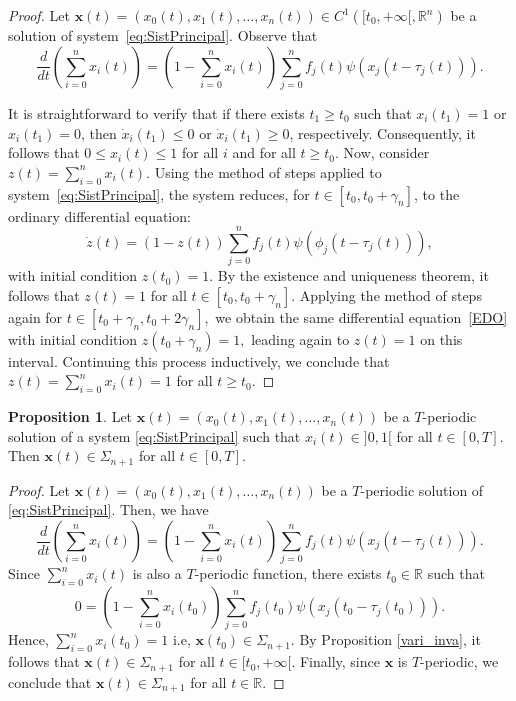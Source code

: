 \documentclass[11pt,reqno]{amsart}
\theoremstyle{definition}
\newtheorem{Proposition}{Proposition}
\begin{document}
\begin{proof}
Let $ \mathbf x(t) = (x_0(t), x_1(t), \dotsc, x_n(t)) \in C^1([t_0, +\infty[, \mathbb{R}^n) $ be a solution of system~\eqref{eq:SistPrincipal}. Observe that  
$$
\frac{d}{dt}\left( \sum_{i=0}^n x_i(t) \right) = \left(1 - \sum_{i=0}^n x_i(t) \right) \sum_{j=0}^n f_j(t)\psi(x_j(t - \tau_j(t))).
$$

It is straightforward to verify that if there exists $ t_1 \geq t_0 $ such that $x_i(t_1) = 1$ or $x_i(t_1) = 0$, then $\dot x_i(t_1) \leq 0$ or $\dot x_i(t_1) \geq 0$, respectively. Consequently, it follows that $0 \leq x_i(t) \leq 1$ for all $i$ and for all $t \geq t_0 $.
Now, consider $z(t) = \sum_{i=0}^n x_i(t).$ Using the method of steps applied to system~\eqref{eq:SistPrincipal}, the system reduces, for $t \in [t_0, t_0 + \gamma_n]$, to the ordinary differential equation:
\begin{equation}\label{EDO}
    \dot z(t) = (1 - z(t)) \sum_{j=0}^n f_j(t)\psi(\phi_j(t - \tau_j(t))),
\end{equation}
with initial condition $z(t_0) = 1.$ By the existence and uniqueness theorem, it follows that $z(t) = 1$ for all $t \in [t_0, t_0 + \gamma_n]$.
Applying the method of steps again for $t \in [t_0 + \gamma_n, t_0 + 2\gamma_n],$ we obtain the same differential equation~\eqref{EDO} with initial condition $z(t_0 + \gamma_n) = 1,$ leading again to $z(t) = 1$ on this interval.
Continuing this process inductively, we conclude that $z(t) = \sum_{i=0}^n x_i(t) = 1$ for all $t \geq t_0.$
\end{proof}

\begin{Proposition}\label{SolPe} Let $\mathbf x(t)=(x_0(t),x_1(t),\dotsc,x_n(t))$ be a $T$-periodic solution of a system \eqref{eq:SistPrincipal} such that $x_i(t)\in]0,1[$ for all $t\in[0,T]$. Then $\mathbf x(t)\in\Sigma_{n+1}$ for all $t\in[0,T]$.
\end{Proposition}

\begin{proof}
Let $\mathbf{x}(t) = (x_0(t), x_1(t), \dots, x_n(t))  $ be a $T$-periodic solution of \eqref{eq:SistPrincipal}. Then, we have
$$
\frac{d}{dt} \left( \sum_{i=0}^n x_i(t) \right) = \left(1 - \sum_{i=0}^n x_i(t)\right) \sum_{j=0}^n f_j(t) \psi(x_j(t - \tau_j(t))).
$$
Since $\sum_{i=0}^n x_i(t)$ is also a $T$-periodic function, there exists $t_0 \in \mathbb{R}$ such that
$$
0 = \left(1 - \sum_{i=0}^n x_i(t_0)\right) \sum_{j=0}^n f_j(t_0) \psi(x_j(t_0 - \tau_j(t_0))).
$$
Hence, $\sum_{i=0}^n x_i(t_0) = 1$ i.e, $\mathbf x(t_0)\in\Sigma_{n+1}$. By Proposition \ref{vari_inva}, it follows that $\mathbf{x}(t) \in \Sigma_{n+1}$ for all $t \in [t_0, +\infty[$. Finally, since $\mathbf{x}$ is $T$-periodic, we conclude that $\mathbf{x}(t) \in \Sigma_{n+1}$ for all $t \in \mathbb{R}$.
\end{proof}
\end{document}
